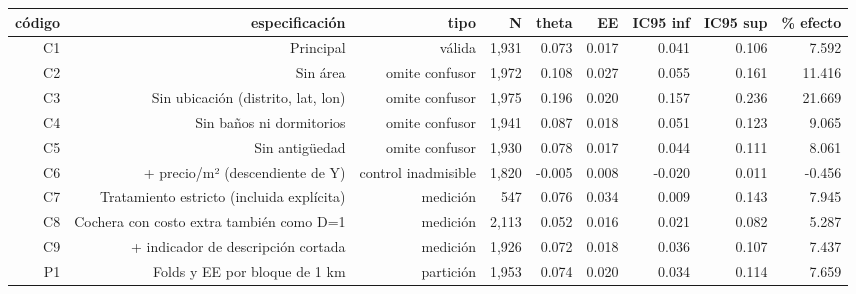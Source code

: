 \begin{tabular}{rrrrrrrrr}
\toprule
código & especificación & tipo & N & theta & EE & IC95 inf & IC95 sup & \% efecto \\
\midrule
C1 & Principal & válida & 1,931 & 0.073 & 0.017 & 0.041 & 0.106 & 7.592 \\
C2 & Sin área & omite confusor & 1,972 & 0.108 & 0.027 & 0.055 & 0.161 & 11.416 \\
C3 & Sin ubicación (distrito, lat, lon) & omite confusor & 1,975 & 0.196 & 0.020 & 0.157 & 0.236 & 21.669 \\
C4 & Sin baños ni dormitorios & omite confusor & 1,941 & 0.087 & 0.018 & 0.051 & 0.123 & 9.065 \\
C5 & Sin antigüedad & omite confusor & 1,930 & 0.078 & 0.017 & 0.044 & 0.111 & 8.061 \\
C6 & + precio/m² (descendiente de Y) & control inadmisible & 1,820 & -0.005 & 0.008 & -0.020 & 0.011 & -0.456 \\
C7 & Tratamiento estricto (incluida explícita) & medición & 547 & 0.076 & 0.034 & 0.009 & 0.143 & 7.945 \\
C8 & Cochera con costo extra también como D=1 & medición & 2,113 & 0.052 & 0.016 & 0.021 & 0.082 & 5.287 \\
C9 & + indicador de descripción cortada & medición & 1,926 & 0.072 & 0.018 & 0.036 & 0.107 & 7.437 \\
P1 & Folds y EE por bloque de 1 km & partición & 1,953 & 0.074 & 0.020 & 0.034 & 0.114 & 7.659 \\
\bottomrule
\end{tabular}